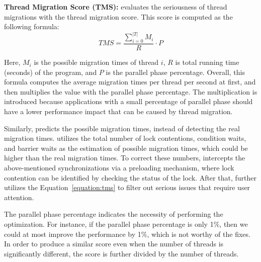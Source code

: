 \textbf{Thread Migration Score (TMS):} \NP{} evaluates the seriousness of thread migrations with the thread migration score. This score is computed as the following formula: 
\begin{equation}
TMS =  \dfrac{\sum_{i=0}^{|T|} {M_i}}{R} \cdot P \label{equation:tms}
\end{equation}


Here,  $M_i$ is the possible migration times of  thread $i$, $R$ is total running time (seconds) of the program, and $P$ is the parallel phase percentage. Overall, this formula computes the average migration times per thread per second at first, and then multiplies the value with the parallel phase percentage. The multiplication is introduced because applications with a small percentage of parallel phase should have a lower performance impact that can be caused by thread migration. 


Similarly, \NP{} predicts the possible migration times, instead of detecting the real migration times. \NP{} utilizes the total number of lock contentions, condition waits, and barrier waits as the estimation of possible migration times, which could be higher than the real migration times. To correct these numbers, \NP{} intercepts the above-mentioned synchronizations via a preloading mechanism, where lock contention can be identified by checking the status of the lock. After that, \NP{} further utilizes the Equation~\ref{equation:tms} to filter out serious issues that require user attention. 

The parallel phase percentage indicates the necessity of performing the optimization. For instance, if the parallel phase percentage is only 1\%, then we could at most improve the performance by 1\%, which is not worthy of the fixes.   In order to produce a similar score even when the number of threads is significantly different, the score is further divided by the number of threads. 

